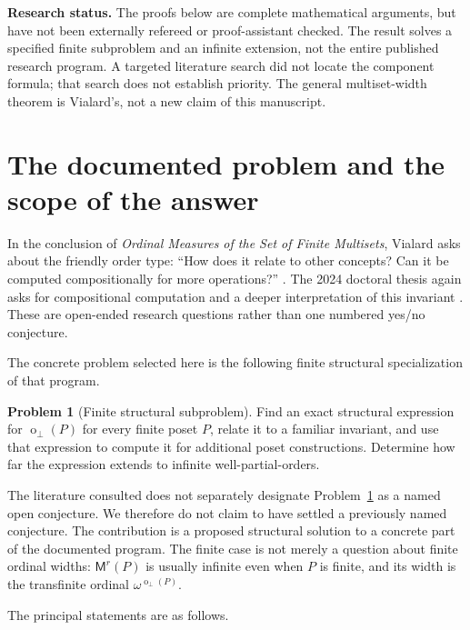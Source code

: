 \documentclass[11pt,a4paper]{article}
\theoremstyle{definition}
\newtheorem{problem}[theorem]{Problem}
\theoremstyle{remark}
\newcommand{\fot}{\operatorname{o}_{\perp}}
\newcommand{\Mr}{\mathsf{M}^{r}}
\begin{document}
\vspace{0.3cm}
\noindent\textbf{Research status.}
The proofs below are complete mathematical arguments, but have not been
externally refereed or proof-assistant checked. The result solves a specified
finite subproblem and an infinite extension, not the entire published
research program. A targeted literature search did not locate the component
formula; that search does not establish priority. The general multiset-width
theorem is Vialard's, not a new claim of this manuscript.

\newpage
\begingroup
\small
\setlength{\parskip}{0pt}
\tableofcontents
\endgroup
\newpage

\section{The documented problem and the scope of the answer}

In the conclusion of \emph{Ordinal Measures of the Set of Finite Multisets},
Vialard asks about the friendly order type: ``How does it relate to other
concepts? Can it be computed compositionally for more operations?''
\cite[p.~87:11]{vialard2023}.
The 2024 doctoral thesis again asks for compositional computation and a
deeper interpretation of this invariant \cite[Conclusion, pp.~109--110]{vialard2024}.
These are open-ended research questions rather than one numbered yes/no
conjecture.

The concrete problem selected here is the following finite structural
specialization of that program.

\begin{problem}[Finite structural subproblem]\label{prob:finite}
Find an exact structural expression for $\fot(P)$ for every finite poset $P$,
relate it to a familiar invariant, and use that expression to compute it for
additional poset constructions. Determine how far the expression extends
to infinite well-partial-orders.
\end{problem}

The literature consulted does not separately designate
Problem~\ref{prob:finite} as a named open conjecture. We therefore do not
claim to have settled a previously named conjecture. The contribution is a
proposed structural solution to a concrete part of the documented program.
The finite case is not merely a question about finite ordinal widths:
$\Mr(P)$ is usually infinite even when $P$ is finite, and its width is the
transfinite ordinal $\omega^{\fot(P)}$.

The principal statements are as follows.
\end{document}
